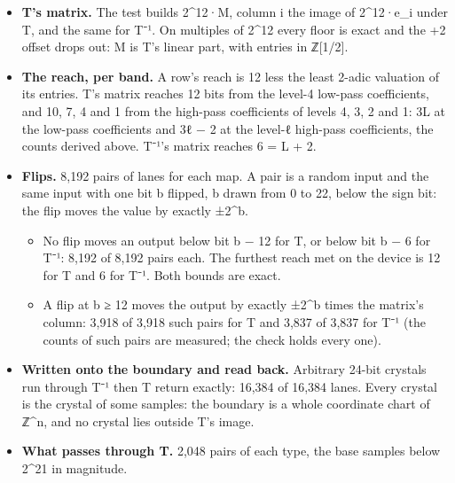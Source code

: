 \begin{itemize}
\item \textbf{T's matrix.} The test builds 2\textasciicircum{}12·M, column i the image of 2\textasciicircum{}12·e\_\allowbreak{}i under T, and the same for T⁻¹. On multiples of 2\textasciicircum{}12 every floor is exact and the +2 offset drops out: M is T's linear part, with entries in ℤ[1/2].
\item \textbf{The reach, per band.} A row's reach is 12 less the least 2-adic valuation of its entries. T's matrix reaches 12 bits from the level-4 low-pass coefficients, and 10, 7, 4 and 1 from the high-pass coefficients of levels 4, 3, 2 and 1: 3L at the low-pass coefficients and 3ℓ − 2 at the level-ℓ high-pass coefficients, the counts derived above. T⁻¹'s matrix reaches 6 = L + 2.
\item \textbf{Flips.} 8,192 pairs of lanes for each map. A pair is a random input and the same input with one bit b flipped, b drawn from 0 to 22, below the sign bit: the flip moves the value by exactly ±2\textasciicircum{}b.

\begin{itemize}
\item No flip moves an output below bit b − 12 for T, or below bit b − 6 for T⁻¹: 8,192 of 8,192 pairs each. The furthest reach met on the device is 12 for T and 6 for T⁻¹. Both bounds are exact.
\item A flip at b ≥ 12 moves the output by exactly ±2\textasciicircum{}b times the matrix's column: 3,918 of 3,918 such pairs for T and 3,837 of 3,837 for T⁻¹ (the counts of such pairs are measured; the check holds every one).
\end{itemize}
\item \textbf{Written onto the boundary and read back.} Arbitrary 24-bit crystals run through T⁻¹ then T return exactly: 16,384 of 16,384 lanes. Every crystal is the crystal of some samples: the boundary is a whole coordinate chart of ℤ\textasciicircum{}n, and no crystal lies outside T's image.
\item \textbf{What passes through T.} 2,048 pairs of each type, the base samples below 2\textasciicircum{}21 in magnitude.


\end{itemize}
